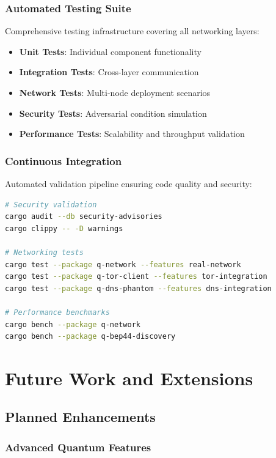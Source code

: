 \documentclass[11pt,a4paper]{article}
\theoremstyle{definition}
\theoremstyle{remark}
\begin{document}
\subsubsection{Automated Testing Suite}

Comprehensive testing infrastructure covering all networking layers:

\begin{itemize}
    \item \textbf{Unit Tests}: Individual component functionality
    \item \textbf{Integration Tests}: Cross-layer communication
    \item \textbf{Network Tests}: Multi-node deployment scenarios
    \item \textbf{Security Tests}: Adversarial condition simulation
    \item \textbf{Performance Tests}: Scalability and throughput validation
\end{itemize}

\subsubsection{Continuous Integration}

Automated validation pipeline ensuring code quality and security:

\begin{lstlisting}[language=bash, caption=CI Pipeline Configuration]
# Security validation
cargo audit --db security-advisories
cargo clippy -- -D warnings

# Networking tests
cargo test --package q-network --features real-network
cargo test --package q-tor-client --features tor-integration
cargo test --package q-dns-phantom --features dns-integration

# Performance benchmarks
cargo bench --package q-network
cargo bench --package q-bep44-discovery
\end{lstlisting}

\section{Future Work and Extensions}

\subsection{Planned Enhancements}

\subsubsection{Advanced Quantum Features}
\end{document}
